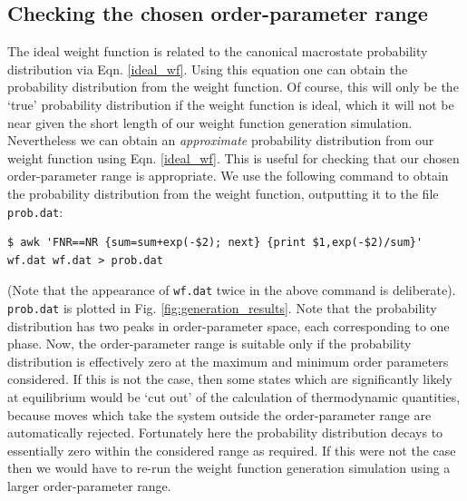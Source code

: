 \documentclass{report}
\begin{document}
\subsection{Checking the chosen order-parameter range}\label{section:double_check}
The ideal weight function is related to the canonical macrostate probability distribution via Eqn. \eqref{ideal_wf}. Using this equation one can obtain the
probability distribution from the weight function. Of course, this will only be the `true' probability distribution if the weight function is ideal, which it
will not be near given the short length of our weight function generation simulation. Nevertheless we can obtain an \emph{approximate} probability distribution 
from our weight function using Eqn. \eqref{ideal_wf}. This is useful for checking that our chosen order-parameter range is appropriate. 
We use the following command to obtain the probability distribution from the weight function, outputting it to the file \texttt{prob.dat}:
\begin{verbatim}
$ awk 'FNR==NR {sum=sum+exp(-$2); next} {print $1,exp(-$2)/sum}'
wf.dat wf.dat > prob.dat
\end{verbatim}
(Note that the appearance of \texttt{wf.dat} twice in the above command is deliberate). \texttt{prob.dat} is plotted in Fig. \ref{fig:generation_results}.
Note that the probability distribution has two peaks in order-parameter space, each corresponding to one phase. Now, the order-parameter
range is suitable only if the probability distribution is effectively zero at the maximum and minimum order parameters considered. If this is not the
case, then some states which are significantly likely at equilibrium would be `cut out' of the calculation of thermodynamic quantities, because moves which
take the system outside the order-parameter range are automatically rejected. Fortunately here the probability distribution decays to essentially zero within 
the considered range as required. If this were not the case then we would have to re-run the weight function generation simulation using a larger 
order-parameter range.
\end{document}
